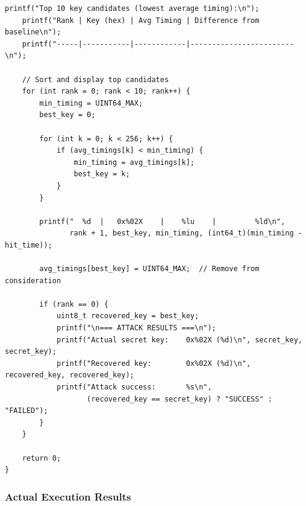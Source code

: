 \documentclass[11pt,a4paper]{article}
\theoremstyle{definition}
\begin{document}
\begin{lstlisting}[caption={Attack Implementation with Results}]
    printf("Top 10 key candidates (lowest average timing):\n");
    printf("Rank | Key (hex) | Avg Timing | Difference from baseline\n");
    printf("-----|-----------|------------|------------------------\n");
    
    // Sort and display top candidates
    for (int rank = 0; rank < 10; rank++) {
        min_timing = UINT64_MAX;
        best_key = 0;
        
        for (int k = 0; k < 256; k++) {
            if (avg_timings[k] < min_timing) {
                min_timing = avg_timings[k];
                best_key = k;
            }
        }
        
        printf("  %d  |   0x%02X    |    %lu    |         %ld\n", 
               rank + 1, best_key, min_timing, (int64_t)(min_timing - hit_time));
        
        avg_timings[best_key] = UINT64_MAX;  // Remove from consideration
        
        if (rank == 0) {
            uint8_t recovered_key = best_key;
            printf("\n=== ATTACK RESULTS ===\n");
            printf("Actual secret key:    0x%02X (%d)\n", secret_key, secret_key);
            printf("Recovered key:        0x%02X (%d)\n", recovered_key, recovered_key);
            printf("Attack success:       %s\n", 
                   (recovered_key == secret_key) ? "SUCCESS" : "FAILED");
        }
    }
    
    return 0;
}
\end{lstlisting}

\subsubsection{Actual Execution Results}
\end{document}
